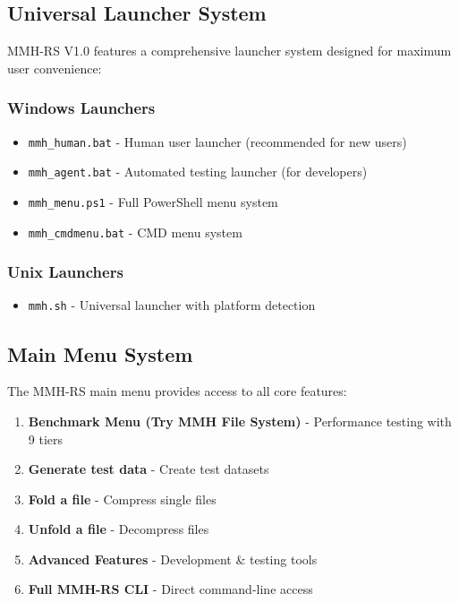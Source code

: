 \documentclass[11pt,a4paper]{article}
\begin{document}
	\subsection{Universal Launcher System}

	MMH-RS V1.0 features a comprehensive launcher system designed for maximum user convenience:

	\subsubsection{Windows Launchers}
	\begin{itemize}
		\item \texttt{mmh\_human.bat} - Human user launcher (recommended for new users)
		\item \texttt{mmh\_agent.bat} - Automated testing launcher (for developers)
		\item \texttt{mmh\_menu.ps1} - Full PowerShell menu system
		\item \texttt{mmh\_cmdmenu.bat} - CMD menu system
	\end{itemize}

	\subsubsection{Unix Launchers}
	\begin{itemize}
		\item \texttt{mmh.sh} - Universal launcher with platform detection
	\end{itemize}

	\subsection{Main Menu System}

	The MMH-RS main menu provides access to all core features:

	\begin{enumerate}
		\item \textbf{Benchmark Menu (Try MMH File System)} - Performance testing with 9 tiers
		\item \textbf{Generate test data} - Create test datasets
		\item \textbf{Fold a file} - Compress single files
		\item \textbf{Unfold a file} - Decompress files
		\item \textbf{Advanced Features} - Development \& testing tools
		\item \textbf{Full MMH-RS CLI} - Direct command-line access
	\end{enumerate}
\end{document}
